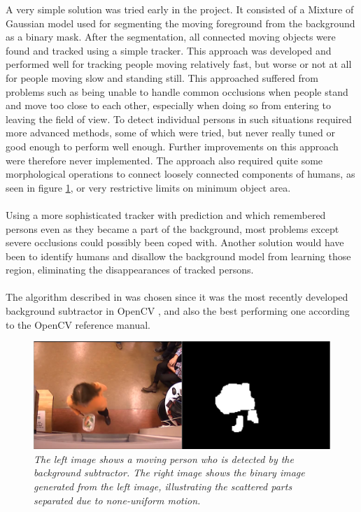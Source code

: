 
A very simple solution was tried early in the project. It consisted of a Mixture of Gaussian model \cite{Gardel} used for segmenting the moving foreground from the background as a binary mask. After the segmentation, all connected moving objects were found and tracked using a simple tracker. This approach was developed and performed well for tracking people moving relatively fast, but worse or not at all for people moving slow and standing still. This approached suffered from problems such as being unable to handle common occlusions when people stand and move too close to each other, especially when doing so from entering to leaving the field of view. To detect individual persons in such situations required more advanced methods, some of which were tried, but never really tuned or good enough to perform well enough. Further improvements on this approach were therefore never implemented. The approach also required quite some morphological operations to connect loosely connected components of humans, as seen in figure \ref{fig:bg_success}, or very restrictive limits on minimum object area.\\
\\
Using a more sophisticated tracker with prediction and which remembered persons even as they became a part of the background, most problems except severe occlusions could possibly been coped with. Another solution would have been to identify humans and disallow the background model from learning those region, eliminating the disappearances of tracked persons. \\
\\
The algorithm described in \cite{Gardel} was chosen since it was the most recently developed background subtractor in OpenCV \cite{OpenCV}, and also the best performing one according to the OpenCV reference manual. 


\vspace{1cm}
\begin{figure}[htb]
	\centering
	\includegraphics[width=\linewidth]{images/bg_success.png}
	\caption[An example of scattered binary mask of a human from the background model.]{\textit{The left image shows a moving person who is detected by the background subtractor. The right image shows the binary image generated from the left image, illustrating the scattered parts separated due to none-uniform motion.
	}}
	\label{fig:bg_success}  %
\end{figure}


